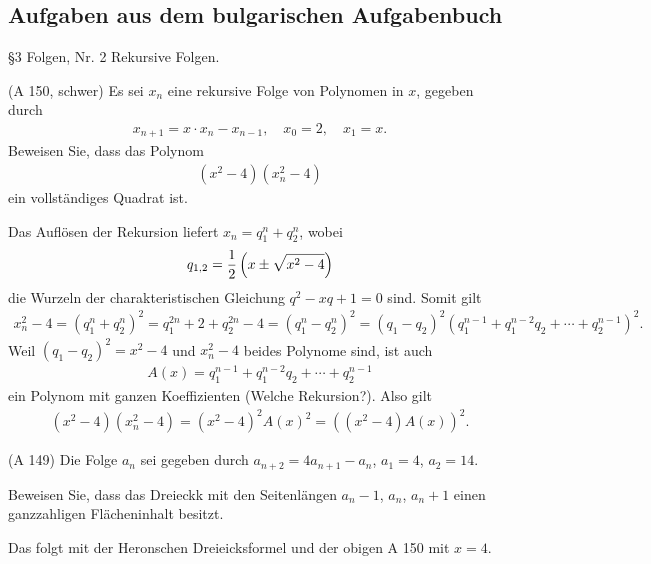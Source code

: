 \documentclass[11pt,a4paper]{article}
\begin{document}
\subsection*{Aufgaben aus dem bulgarischen Aufgabenbuch}
 \S 3 Folgen, Nr. 2 Rekursive Folgen.

\begin{aufgabe}(A 150, schwer)
Es sei $x_n$ eine rekursive Folge von Polynomen in $x$, gegeben durch
\begin{gather*}
x_{n+1} = x\cdot x_n -x_{n-1}, \quad x_0=2,\quad x_1= x.
\end{gather*}
Beweisen Sie, dass das Polynom
\begin{gather*}
(x^2-4) (x_n^2 -4)
\end{gather*}
ein vollständiges Quadrat ist.
\end{aufgabe}

\begin{beweis} 
Das Auflösen der Rekursion liefert $x_n=q_1^n +q_2^n$, wobei
\begin{gather*}
q_{1,2}=\frac{1}{2}\left(x \pm \sqrt{x^2 -4}\right)
\end{gather*}
die Wurzeln der charakteristischen Gleichung $q^2 -xq +1 =0$ sind. Somit gilt
\begin{gather*}
x_n^2-4 =(q_1^n +q_2^n)^2 =q_1^{2n} +2 +q_2^{2n } -4 =(q_1^n -q_2^n)^2
=(q_1 -q_2)^2(q_1^{n-1} +q_1^{n-2}q_2 +\cdots +q_2^{n-1})^2.
\end{gather*}
Weil $(q_1 -q_2)^2 = x^2 -4$  und $x_n^2 -4$ beides Polynome sind, ist auch
\begin{gather*}
A(x)= q_1^{n-1} +q_1^{n-2}q_2 +\cdots +q_2^{n-1}
\end{gather*} 
ein Polynom mit ganzen Koeffizienten (Welche Rekursion?). Also gilt
\begin{gather*}
(x^2-4)(x_n^2 -4)=(x^2-4)^2 A(x)^2=((x^2-4) A(x))^2.
\end{gather*}
\end{beweis}

\begin{aufgabe} (A 149) Die Folge $a_n$ sei gegeben durch $a_{n+2}=4a_{n+1}
  -a_n$, $ a_1= 4$, $a_2=14$.

Beweisen Sie, dass das Dreieckk mit den Seitenlängen $a_n-1$, $a_n$, $a_{n} +1$
einen ganzzahligen Flächeninhalt besitzt.
\end{aufgabe}
\begin{beweis} 
Das folgt mit der {\sc Heron}schen Dreieicksformel und der obigen A 150 mit
$x=4$.
\end{beweis}
\end{document}
